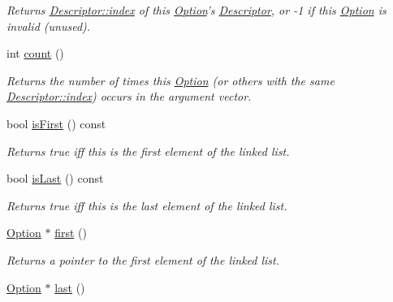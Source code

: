 \begin{DoxyCompactItemize}
\begin{DoxyCompactList}\small\item\em Returns \hyperlink{structxmem_1_1config_1_1third__party_1_1_descriptor_aacf3d44f35c61f22be65da078f60734b}{Descriptor\-::index} of this \hyperlink{classxmem_1_1config_1_1third__party_1_1_option}{Option}'s \hyperlink{structxmem_1_1config_1_1third__party_1_1_descriptor}{Descriptor}, or -\/1 if this \hyperlink{classxmem_1_1config_1_1third__party_1_1_option}{Option} is invalid (unused). \end{DoxyCompactList}\item 
int \hyperlink{classxmem_1_1config_1_1third__party_1_1_option_ae10dde777907e632276e585539047576}{count} ()
\begin{DoxyCompactList}\small\item\em Returns the number of times this \hyperlink{classxmem_1_1config_1_1third__party_1_1_option}{Option} (or others with the same \hyperlink{structxmem_1_1config_1_1third__party_1_1_descriptor_aacf3d44f35c61f22be65da078f60734b}{Descriptor\-::index}) occurs in the argument vector. \end{DoxyCompactList}\item 
bool \hyperlink{classxmem_1_1config_1_1third__party_1_1_option_aa15a4bdfb804f7d7431d0895ed4068d2}{is\-First} () const 
\begin{DoxyCompactList}\small\item\em Returns true iff this is the first element of the linked list. \end{DoxyCompactList}\item 
bool \hyperlink{classxmem_1_1config_1_1third__party_1_1_option_a3aa92482d52df551ceb135d9efb34a7f}{is\-Last} () const 
\begin{DoxyCompactList}\small\item\em Returns true iff this is the last element of the linked list. \end{DoxyCompactList}\item 
\hyperlink{classxmem_1_1config_1_1third__party_1_1_option}{Option} $\ast$ \hyperlink{classxmem_1_1config_1_1third__party_1_1_option_a6c8907c4faaf8c099d556db54bfca1a5}{first} ()
\begin{DoxyCompactList}\small\item\em Returns a pointer to the first element of the linked list. \end{DoxyCompactList}\item 
\hyperlink{classxmem_1_1config_1_1third__party_1_1_option}{Option} $\ast$ \hyperlink{classxmem_1_1config_1_1third__party_1_1_option_a79bd212eaf002df298da1b3b46e34cea}{last} ()

\end{DoxyCompactItemize}
